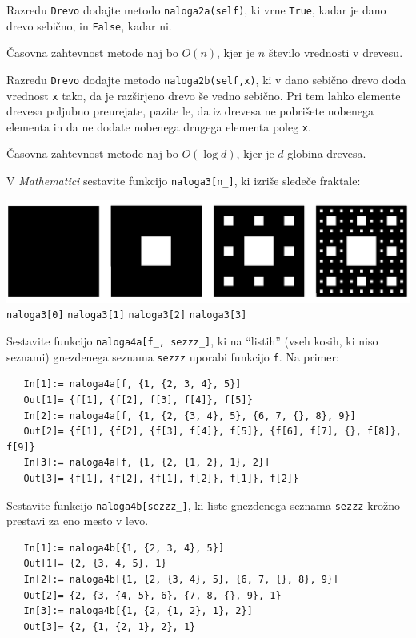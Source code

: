 \documentclass[arhiv]{izpit}
\begin{document}
\podnaloga
Razredu \verb|Drevo| dodajte metodo \verb|naloga2a(self)|,
  ki vrne \verb|True|, kadar je dano drevo sebično, in \verb|False|, kadar ni.

Časovna zahtevnost metode naj bo $O(n)$, kjer je $n$ število vrednosti v drevesu.

\podnaloga
Razredu \verb|Drevo| dodajte metodo \verb|naloga2b(self,x)|,
  ki v dano sebično drevo doda vrednost \verb|x| tako,
  da je razširjeno drevo še vedno sebično.
Pri tem lahko elemente drevesa poljubno preurejate,
  pazite le, da iz drevesa ne pobrišete nobenega elementa
  in da ne dodate nobenega drugega elementa poleg \verb|x|.

Časovna zahtevnost metode naj bo $O(\log d)$, kjer je $d$ globina drevesa.

\naloga[25 točk]
V \emph{Mathematici} sestavite funkcijo \verb|naloga3[n_]|,
  ki izriše sledeče fraktale:

\begin{center}
  \includegraphics[width=\textwidth]{gobe.pdf} \\
  \verb|naloga3[0]|\qquad\qquad\qquad
  \verb|naloga3[1]|\qquad\quad\qquad
  \verb|naloga3[2]|\qquad\qquad\qquad
  \verb|naloga3[3]|
\end{center}

\naloga[25 točk]

\podnaloga
Sestavite funkcijo \verb|naloga4a[f_, sezzz_]|,
  ki na ``listih'' (vseh kosih, ki niso seznami)
  gnezdenega seznama \verb|sezzz| uporabi funkcijo \verb|f|.
Na primer:
{\small\begin{verbatim}
   In[1]:= naloga4a[f, {1, {2, 3, 4}, 5}]
   Out[1]= {f[1], {f[2], f[3], f[4]}, f[5]}
   In[2]:= naloga4a[f, {1, {2, {3, 4}, 5}, {6, 7, {}, 8}, 9}]
   Out[2]= {f[1], {f[2], {f[3], f[4]}, f[5]}, {f[6], f[7], {}, f[8]}, f[9]}
   In[3]:= naloga4a[f, {1, {2, {1, 2}, 1}, 2}]
   Out[3]= {f[1], {f[2], {f[1], f[2]}, f[1]}, f[2]}\end{verbatim}}

\podnaloga
Sestavite funkcijo \verb|naloga4b[sezzz_]|,
  ki liste gnezdenega seznama \verb|sezzz| krožno prestavi za eno mesto v levo.
{\small\begin{verbatim}
   In[1]:= naloga4b[{1, {2, 3, 4}, 5}]
   Out[1]= {2, {3, 4, 5}, 1}
   In[2]:= naloga4b[{1, {2, {3, 4}, 5}, {6, 7, {}, 8}, 9}]
   Out[2]= {2, {3, {4, 5}, 6}, {7, 8, {}, 9}, 1}
   In[3]:= naloga4b[{1, {2, {1, 2}, 1}, 2}]
   Out[3]= {2, {1, {2, 1}, 2}, 1}\end{verbatim}}
\end{document}
